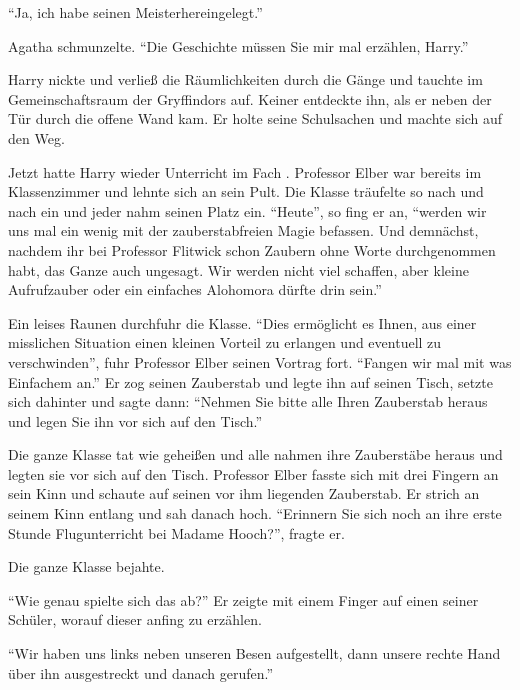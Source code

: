 \enquote{Ja, ich habe seinen Meister\abs hereingelegt.}

Agatha schmunzelte. \enquote{Die Geschichte müssen Sie mir mal erzählen, Harry.}

Harry nickte und verließ die Räumlichkeiten durch die Gänge und tauchte im Gemeinschaftsraum der Gryffindors auf. Keiner entdeckte ihn, als er neben der Tür durch die offene Wand kam. Er holte seine Schulsachen und machte sich auf den Weg.

Jetzt hatte Harry wieder Unterricht im Fach \VgddK. Professor Elber war bereits im Klassenzimmer und lehnte sich an sein Pult. Die Klasse träufelte so nach und nach ein und jeder nahm seinen Platz ein. \enquote{Heute}, so fing er an, \enquote{werden wir uns mal ein wenig mit der zauberstabfreien Magie befassen. Und demnächst, nachdem ihr bei Professor Flitwick schon Zaubern ohne Worte durchgenommen habt, das Ganze auch ungesagt. Wir werden nicht viel schaffen, aber kleine Aufrufzauber oder ein einfaches Alohomora dürfte drin sein.}

Ein leises Raunen durchfuhr die Klasse. \enquote{Dies ermöglicht es Ihnen, aus einer misslichen Situation einen kleinen Vorteil zu erlangen und eventuell zu verschwinden}, fuhr Professor Elber seinen Vortrag fort. \enquote{Fangen wir mal mit was Einfachem an.} Er zog seinen Zauberstab und legte ihn auf seinen Tisch, setzte sich dahinter und sagte dann: \enquote{Nehmen Sie bitte alle Ihren Zauberstab heraus und legen Sie ihn vor sich auf den Tisch.}

Die ganze Klasse tat wie geheißen und alle nahmen ihre Zauberstäbe heraus und legten sie vor sich auf den Tisch. Professor Elber fasste sich mit drei Fingern an sein Kinn und schaute auf seinen vor ihm liegenden Zauberstab. Er strich an seinem Kinn entlang und sah danach hoch. \enquote{Erinnern Sie sich noch an ihre erste Stunde Flugunterricht bei Madame Hooch?}, fragte er.

Die ganze Klasse bejahte.

\enquote{Wie genau spielte sich das ab?} Er zeigte mit einem Finger auf einen seiner Schüler, worauf dieser anfing zu erzählen.

\enquote{Wir haben uns links neben unseren Besen aufgestellt, dann unsere rechte Hand über ihn ausgestreckt und danach  gerufen.}

